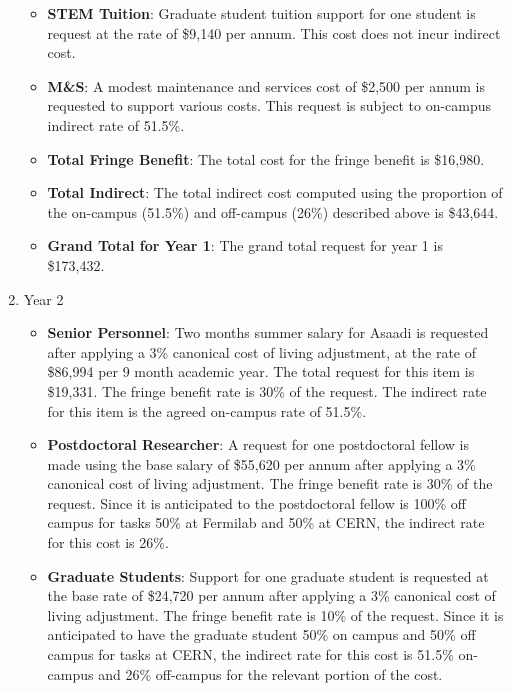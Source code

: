\begin{enumerate}
\begin{itemize}[noitemsep,nolistsep]
\item {{\bf STEM Tuition}: Graduate student tuition support for one student is request at the rate of \$9,140 per annum.  This cost does not incur indirect cost.}

\item {{\bf M\&S}: A modest maintenance and services cost of \$2,500 per annum is requested to support various costs.   This request is subject to on-campus indirect rate of 51.5\%.}

\item {{\bf Total Fringe Benefit}: The total cost for the fringe benefit is \$16,980.}

\item {{\bf Total Indirect}: The total indirect cost computed using the proportion of the on-campus (51.5\%) and off-campus (26\%) described above is \$43,644.}

\item {{\bf Grand Total for Year 1}: The grand total request for year 1 is \$173,432.}

\end{itemize}

\item{Year 2}
\begin{itemize}[noitemsep,nolistsep]
\item{{\bf Senior Personnel}: Two months summer salary for Asaadi is requested after applying a 3\% canonical cost of living adjustment, at the rate of \$86,994 per 9 month academic year.  The total request for this item is \$19,331.   The fringe benefit rate is 30\% of the request.  The indirect rate for this item is the agreed on-campus rate of 51.5\%.}

\item {{\bf Postdoctoral Researcher}: A request for one postdoctoral fellow is made using the base salary of \$55,620 per annum after applying a 3\% canonical cost of living adjustment.  The fringe benefit rate is 30\% of the request.  Since it is anticipated to the postdoctoral fellow is 100\% off campus for tasks 50\% at Fermilab and 50\% at CERN, the indirect rate for this cost is 26\%.} 

\item{{\bf Graduate Students}: Support for one graduate student is requested at the base rate of \$24,720 per annum after applying a 3\% canonical cost of living adjustment.   The fringe benefit rate is 10\% of the request.  Since it is anticipated to have the graduate student 50\% on campus and 50\% off campus for tasks at CERN, the indirect rate for this cost is 51.5\% on-campus and 26\% off-campus for the relevant portion of the cost.  }


\end{itemize}
\end{enumerate}
